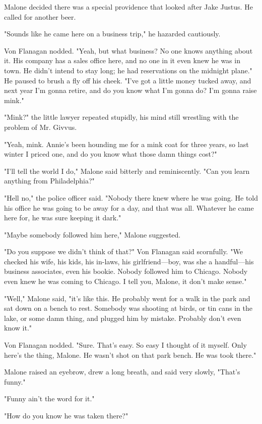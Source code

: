 \documentclass{novel}
\begin{document}
Malone decided there was a special providence that looked after Jake Justus. He called for another beer.

"Sounds like he came here on a business trip," he hazarded cautiously.

Von Flanagan nodded. "Yeah, but what business? No one knows anything about it. His company has a sales office here, and no one in it even knew he was in town. He didn't intend to stay long; he had reservations on the midnight plane." He paused to brush a fly off his cheek. "I've got a little money tucked away, and next year I'm gonna retire, and do you know what I'm gonna do? I'm gonna raise mink."

"Mink?" the little lawyer repeated stupidly, his mind still wrestling with the problem of Mr. Givvus.

"Yeah, mink. Annie's been hounding me for a mink coat for three years, so last winter I priced one, and do you know what those damn things cost?"

"I'll tell the world I do," Malone said bitterly and reminiscently. "Can you learn anything from Philadelphia?"

"Hell no," the police officer said. "Nobody there knew where he was going. He told his office he was going to be away for a day, and that was all. Whatever he came here for, he was sure keeping it dark."

"Maybe somebody followed him here," Malone suggested.

"Do you suppose we didn't think of that?" Von Flanagan said scornfully. "We checked his wife, his kids, his in-laws, his girlfriend—boy, was she a handful—his business associates, even his bookie. Nobody followed him to Chicago. Nobody even knew he was coming to Chicago. I tell you, Malone, it don't make sense."

"Well," Malone said, "it's like this. He probably went for a walk in the park and sat down on a bench to rest. Somebody was shooting at birds, or tin cans in the lake, or some damn thing, and plugged him by mistake. Probably don't even know it."

Von Flanagan nodded. "Sure. That's easy. So easy I thought of it myself. Only here's the thing, Malone. He wasn't shot on that park bench. He was took there."

Malone raised an eyebrow, drew a long breath, and said very slowly, "That's funny."

"Funny ain't the word for it."

"How do you know he was taken there?"
\end{document}
